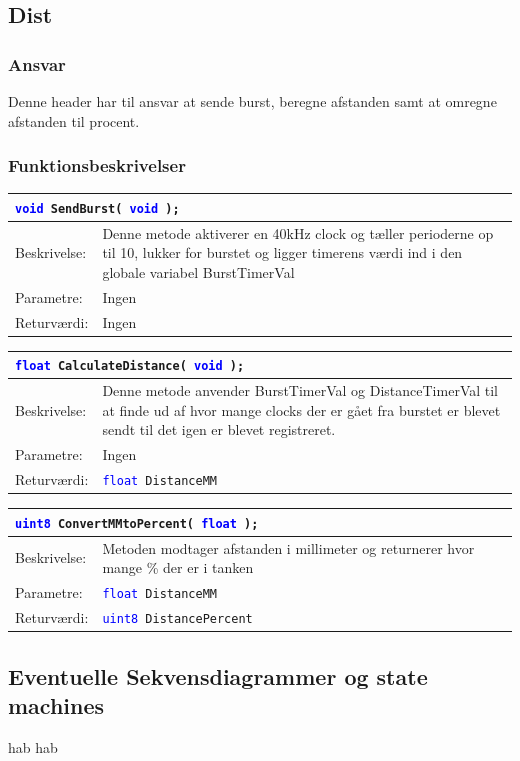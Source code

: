 \subsection{Dist}
\subsubsection{Ansvar}
Denne header har til ansvar at sende burst, beregne afstanden samt at omregne afstanden til procent.
\subsubsection{Funktionsbeskrivelser}

\begin{table}[H]
\begin{tabular}{l p{12.5cm}}
\multicolumn{2}{l}{\texttt{\textcolor{blue}{void} SendBurst( \textcolor{blue}{void} );}} \\
\hline
Beskrivelse:&Denne metode aktiverer en 40kHz clock og tæller perioderne op til 10, lukker for burstet og ligger timerens værdi ind i den globale variabel BurstTimerVal\\
Parametre:&Ingen\\
Returværdi:&Ingen\\
\end{tabular}
\end{table}

\begin{table}[H]
\begin{tabular}{l p{12.5cm}}
\multicolumn{2}{l}{\texttt{\textcolor{blue}{float} CalculateDistance( \textcolor{blue}{void} );}} \\
\hline
Beskrivelse:&Denne metode anvender BurstTimerVal og DistanceTimerVal til at finde ud af hvor mange clocks der er gået fra burstet er blevet sendt til det igen er blevet registreret.\\
Parametre:&Ingen\\
Returværdi:&\texttt{\textcolor{blue}{float} DistanceMM}\\
\end{tabular}
\end{table}

\begin{table}[H]
\begin{tabular}{l p{12.5cm}}
\multicolumn{2}{l}{\texttt{\textcolor{blue}{uint8} ConvertMMtoPercent( \textcolor{blue}{float} );}} \\
\hline
Beskrivelse:&Metoden modtager afstanden i millimeter og returnerer hvor mange \% der er i tanken\\
Parametre:&\texttt{\textcolor{blue}{float} DistanceMM}\\
Returværdi:&\texttt{\textcolor{blue}{uint8} DistancePercent}\\
\end{tabular}
\end{table}
\subsection{Eventuelle Sekvensdiagrammer og state machines}
hab hab